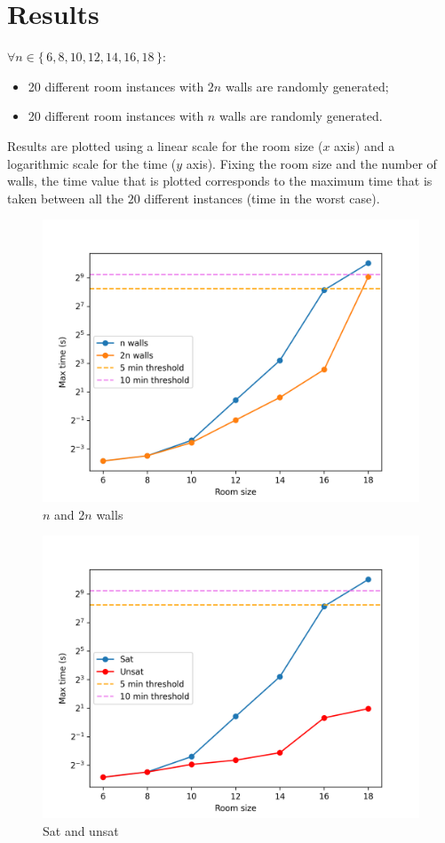 \documentclass[12pt]{article}
\newcommand*{\itc}{\mathrel{:}} %
\begin{document}
\section{Results}
$\forall n \in \{\, 6, 8, 10, 12, 14, 16, 18 \,\} \itc $
\begin{itemize}
  \item
  20 different room instances with $2n$ walls are randomly generated;
  \item
  20 different room instances with $n$ walls are randomly generated.
\end{itemize}
Results are plotted using a linear scale for the room size ($x$ axis) and
a logarithmic scale for the time ($y$ axis).
Fixing the room size and the number of walls, the time value that is plotted
corresponds to the maximum time that is taken between all the $20$ different
instances (time in the worst case).
\begin{figure}[H]
  \centering
  \includegraphics[width=.9\linewidth]{Code/n-2n.png}
  \caption{$n$ and $2n$ walls}
  \label{n-2n}
\end{figure}
\begin{figure}[H]
  \centering
  \includegraphics[width=.9\linewidth]{Code/sat-unsat.png}
  \caption{Sat and unsat}
  \label{sat-unsat}
\end{figure}
\end{document}
